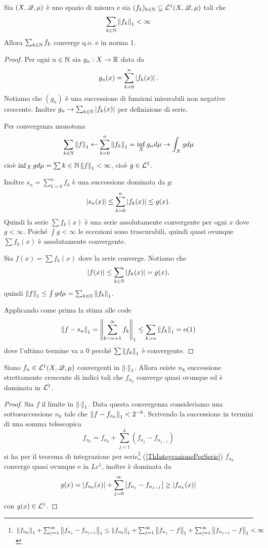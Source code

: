 \begin{theorem}\label{ThIntegrazionePerSerie}
    Sia $(X,\mathscr{Q},\mu)$ \`e uno spazio di misura e sia $(f_k)_{k\in\mathbb{N}}\subseteq \mathcal{L}^1(X,\mathscr{Q},\mu)$ tali che
    \[\sum_{k\in \mathbb{N}}\left\Vert{f_k}\right\Vert_1<\infty\]
Allora $\sum_{k\in\mathbb{N}}f_k$ converge q.o. e in norma 1.
\end{theorem}
\begin{proof}
Per ogni $n\in\mathbb{N}$ sia $g_n:X\to \mathbb{R}$ data da
\[g_n(x)=\sum_{k=0}^n\left|{f_k(x)}\right|.\]
Notiamo che $(g_n)$ \`e una successione di funzioni misurabili non negative crescente. Inoltre $g_n\to \sum_{k\in\mathbb{N}}\left|{f_k(x)}\right|$ per definizione di serie.

Per convergenza monotona
\[\sum_{k\in\mathbb{N}}\left\Vert{f}\right\Vert_1\leftarrow\sum_{k=0}^n\left\Vert{f_k}\right\Vert_1=\inf_X g_nd\mu\to \int_X gd\mu\]
cio\`e $\inf_X gd\mu=\sum{k\in\mathbb{N}}\left\Vert{f}\right\Vert_1<\infty$, cio\`e $g\in\mathcal{L}^1$.

Inoltre $s_n=\sum_{k=0}^nf_k$ \`e una successione dominata da $g$:
\[\left|{s_n(x)}\right|\leq \sum_{k=0}^n\left|{f_k(x)}\right|\leq g(x).\]
Quindi la serie $\sum f_k(x)$ \`e una serie assolutamente convergente per ogni $x$ dove $g<\infty$. Poich\'e $\int g<\infty$ le eccezioni sono trascurabili, quindi quasi ovunque $\sum f_k(x)$ \`e assolutamente convergente.

Sia $f(x)=\sum f_k(x)$ dove la serie converge. Notiamo che
\[\left|{f(x)}\right|\leq \sum_{k\in\mathbb{N}}\left|{f_k(x)}\right|=g(x),\]
quindi $\left\Vert{f}\right\Vert_1\leq \int gd\mu=\sum_{k\in\mathbb{N}}\left\Vert{f_k}\right\Vert_1$.

Applicando come prima la stima alle code
\[\left\Vert{f-s_n}\right\Vert_1=\left\Vert{\sum_{k=n+1}^\infty f_k}\right\Vert_1\leq \sum_{k>n}\left\Vert{f_k}\right\Vert_1=o(1)\]
dove l'ultimo termine va a 0 perch\'e $\sum\left\Vert{f_k}\right\Vert_1$ \`e convergente.
\end{proof}

\begin{corollary}[Weil]\label{CorTeoremaWeil}
Siano $f_n\in \mathcal{L}^1(X,\mathscr{Q},\mu)$ convergenti in $\left\Vert{\cdot}\right\Vert_1$. Allora esiste $n_k$ successione strettamente crescente di indici tali che $f_{n_k}$ converge quasi ovunque ed \`e dominata in $\mathcal{L}^1$.
\end{corollary}
\begin{proof}
Sia $f$ il limite in $\left\Vert{\cdot}\right\Vert_1$. Data questa convergenza consideriamo una sottosuccessione $n_k$ tale che $\left\Vert{f-f_{n_k}}\right\Vert_1<2^{-k}$. Scrivendo la successione in termini di una somma telescopica
\[f_{n_k}=f_{n_0}+\sum_{j=1}^k(f_{n_j}-f_{n_{j-1}})\]
si ha per il teorema di integrazione per serie\footnote{$\left\Vert{f_{n_0}}\right\Vert_1+\sum_{j=1}^\infty \left\Vert{f_{n_j}-f_{n_{j-1}}}\right\Vert_1\leq \left\Vert{f_{n_0}}\right\Vert_1+\sum_{j=1}^\infty \left\Vert{f_{n_j}-f}\right\Vert_1+ \sum_{j=1}^\infty \left\Vert{f_{n_{j-1}}-f}\right\Vert_1<\infty$} (\ref{ThIntegrazionePerSerie}) $f_{n_k}$ converge quasi ovunque e in $Lc^1$, inoltre \`e dominata da
\[g(x)=\left|{f_{n_0}(x)}\right|+\sum_{j=0}^\infty\left|{f_{n_j}-f_{n_{j-1}}}\right|\geq \left|{f_{n_k}(x)}\right|\]
con $g(x)\in \mathcal{L}^1$.
\end{proof}

